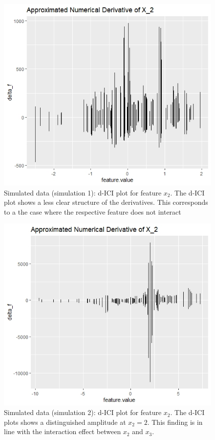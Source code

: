 \documentclass[]{krantz}
\begin{document}
\begin{figure}

{\centering \includegraphics[width=0.75\linewidth]{images/03-7-3} 

}

\caption{Simulated data (simulation 1): d-ICI plot for feature $x_{2}$. The d-ICI plot shows a less clear structure of the derivatives. This corresponds to a the case where the respective feature does not interact}\label{fig:fig3}
\end{figure}\begin{figure}

{\centering \includegraphics[width=0.75\linewidth]{images/03-7-4} 

}

\caption{Simulated data (simulation 2): d-ICI plot for feature $x_{2}$. The d-ICI plots shows a distinguished amplitude at $x_{2} = 2$. This finding is in line with the interaction effect between $x_{2}$ and $x_{3}$.}\label{fig:fig4}
\end{figure}
\end{document}

